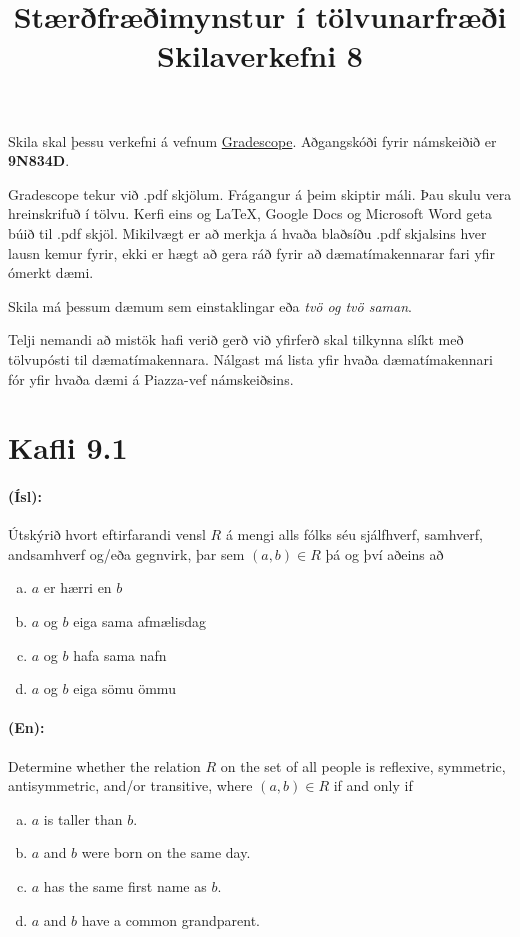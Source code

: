 \documentclass{article}
\title{Stærðfræðimynstur í tölvunarfræði \\ Skilaverkefni 8}
\author{}
\begin{document}
\maketitle

Skila skal þessu verkefni á vefnum \href{https://gradescope.com/courses/9487}{Gradescope}. Aðgangskóði fyrir námskeiðið er \textbf{9N834D}. 

Gradescope tekur við .pdf skjölum. Frágangur á þeim skiptir máli. Þau skulu vera hreinskrifuð í tölvu. Kerfi eins og \LaTeX, Google Docs og Microsoft Word geta búið til .pdf skjöl. Mikilvægt er að merkja á hvaða blaðsíðu .pdf skjalsins hver lausn kemur fyrir, ekki er hægt að gera ráð fyrir að dæmatímakennarar fari yfir ómerkt dæmi.

Skila má þessum dæmum sem einstaklingar eða \emph{tvö og tvö saman}.

Telji nemandi að mistök hafi verið gerð við yfirferð skal tilkynna slíkt með tölvupósti til dæmatímakennara. Nálgast má lista yfir hvaða dæmatímakennari fór yfir hvaða dæmi á Piazza-vef námskeiðsins.

\section{Kafli 9.1}

\question

\paragraph{(Ísl):} Útskýrið hvort eftirfarandi vensl $R$ á mengi alls fólks séu sjálfhverf, samhverf, andsamhverf og/eða gegnvirk, þar sem $(a,b)\in R$ þá og því aðeins að
\begin{enumerate}[a)]
    \item $a$ er hærri en $b$
    \item $a$ og $b$ eiga sama afmælisdag
    \item $a$ og $b$ hafa sama nafn
    \item $a$ og $b$ eiga sömu ömmu
\end{enumerate}

\paragraph{(En):} Determine whether the relation $R$ on the set of all people
is reflexive, symmetric, antisymmetric, and/or transitive,
where $(a,b)\in R$  if and only if

\begin{enumerate}[a)]
    \item $a$ is taller than $b$.
    \item $a$ and $b$ were born on the same day.
    \item $a$ has the same first name as $b$.
    \item $a$ and $b$ have a common grandparent.
\end{enumerate}
\end{document}
